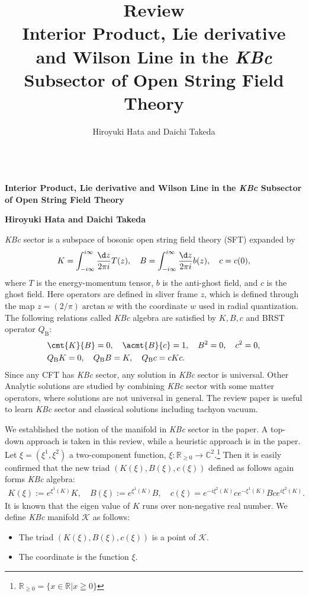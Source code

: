 \documentclass[12pt]{article}
\title{\textbf{Review}\\
Interior Product, Lie derivative and Wilson Line in the \textit{KBc} Subsector of Open String Field Theory
}
\author{Hiroyuki Hata and Daichi Takeda}
\date{}
\renewcommand{\thefootnote}{\fnsymbol{footnote}}
\begin{document}
{\Large{}\\[2mm]
\textbf{Interior Product, Lie derivative and Wilson Line in the \textit{KBc} Subsector of Open String Field Theory
}
}

\noindent
\hfill\textbf{Hiroyuki Hata and Daichi Takeda}

\renewcommand{\thefootnote}{\arabic{footnote})}
\setcounter{footnote}{0}
\vspace{12pt}
\textit{KBc} sector is a subspace of bosonic open string field theory (SFT) expanded by
\begin{align}
	K = \int_{-i\infty}^{i\infty}\frac{\d z}{2\pi i}T(z),\quad
	B =  \int_{-i\infty}^{i\infty}\frac{\d z}{2\pi i}b(z),\quad 
	c = c(0),
\end{align}
where $T$ is the energy-momentum tensor, $b$ is the anti-ghost field, and $c$ is the ghost field.
Here operators are defined in sliver frame $z$, which is defined through the map $z = (2/\pi)\arctan w$ with the coordinate $w$ used in radial quantization.
The following relations called \textit{KBc} algebra are satisfied by $K,B,c$ and BRST operator $Q_\mathrm{B}$:
\begin{align}
	&\cmt{K}{B} = 0,\quad
	\acmt{B}{c} = 1,\quad
	B^2 = 0,\quad
	c^2 = 0,\\
	&Q_\mathrm{B}K = 0,\quad
	Q_\mathrm{B}B = K,\quad
	Q_\mathrm{B}c = cKc.
\end{align}
Since any CFT has \textit{KBc} sector, any solution in \textit{KBc} sector is universal.
Other Analytic solutions are studied by combining \textit{KBc} sector with some matter operators,
where solutions are not universal in general.
The review paper \cite{Okawa:2012ica} is useful to learn \textit{KBc} sector and classical solutions including tachyon vacuum.

We established the notion of the manifold in \textit{KBc} sector in the paper.
A top-down approach is taken in this review, while a heuristic approach is in the paper.
Let $\xi = (\xi^1,\xi^2)$ a two-component function, $\xi:\mathbb R_{\ge 0}\to \mathbb C^2$.\footnote{$\mathbb R_{\ge 0} = \{x\in\mathbb R|x\geqq 0\}$}
Then it is easily confirmed that the new triad $(K(\xi),B(\xi),c(\xi))$ defined as follows again forms \textit{KBc} algebra:
\begin{align}
	K(\xi) := e^{\xi^1(K)}K,\quad B(\xi) := e^{\xi^1(K)}B,\quad c(\xi) = e^{-i\xi^2(K)}ce^{-\xi^1(K)}Bce^{i\xi^2(K)}.
\end{align}
It is known that the eigen value of $K$ runs over non-negative real number.
We define \textit{KBc} manifold $\mathcal K$ as follows:
\begin{itemize}
	\item The triad $(K(\xi),B(\xi),c(\xi))$ is a point of $\mathcal K$.
	\item The coordinate is the function $\xi$.
\end{itemize}
\end{document}
